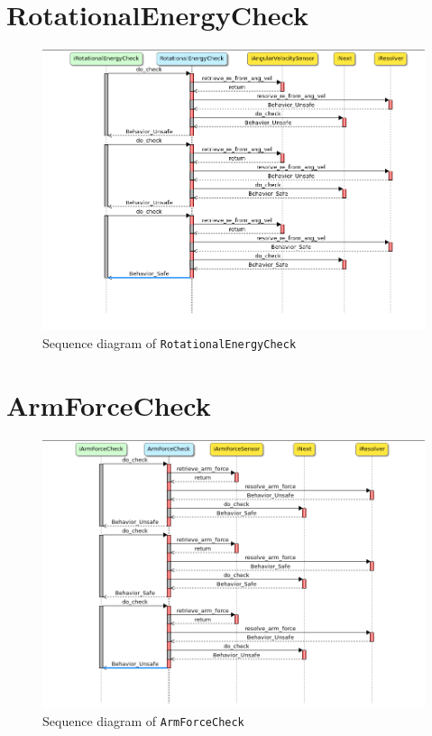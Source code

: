 \documentclass[12pt]{scrreprt}
\begin{document}
\begin{appendices}
\section{RotationalEnergyCheck}
\label{aRotationalEnergyCheck}

\begin{figure}[H]
    \centering
    \includegraphics[width=\textwidth]{Figures/results/modelling_figures/RotationalEnergyCheck/RotationalEnergyCheck_seq.png}
    \caption{Sequence diagram of \texttt{RotationalEnergyCheck}}
    \label{fig:RotationalEnergyCheck_seq}
\end{figure}


\section{ArmForceCheck}
\label{aArmForceCheck}

\begin{figure}[H]
    \centering
    \includegraphics[width=\textwidth]{Figures/results/modelling_figures/ArmForceCheck/ArmForceCheck_seq.png}
    \caption{Sequence diagram of \texttt{ArmForceCheck}}
    \label{fig:ArmForceCheck_seq}
\end{figure}



\end{appendices}
\end{document}
